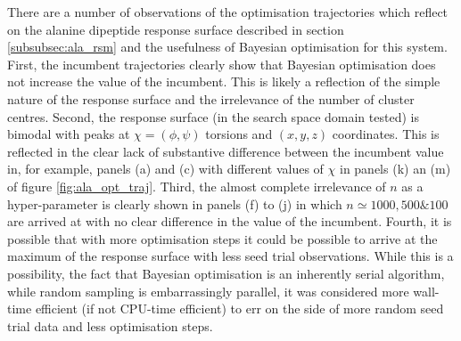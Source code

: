 There are a number of observations of the optimisation trajectories which reflect on the alanine dipeptide response surface described in section \ref{subsubsec:ala_rsm} and the usefulness of Bayesian optimisation for this system. First, the incumbent trajectories clearly show that Bayesian optimisation does not increase the value of the incumbent. This is likely a reflection of the simple nature of the response surface and the irrelevance of the number of cluster centres. Second, the response surface (in the search space domain tested) is bimodal with peaks at $\chi=(\phi, \psi)$ torsions and $(x, y, z)$ coordinates. This is reflected in the clear lack of substantive difference between the incumbent value in, for example, panels (a) and (c) with different values of $\chi$ in panels (k) an (m)  of figure \ref{fig:ala_opt_traj}. Third, the almost complete irrelevance of $n$ as a hyper-parameter is clearly shown in panels (f) to (j) in which $n \simeq 1000, 500 \& 100$ are arrived at with no clear difference in the value of the incumbent. Fourth, it is possible that with more optimisation steps it could be possible to arrive at the maximum of the response surface with less seed trial observations. While this is a possibility, the fact that Bayesian optimisation is an inherently serial algorithm, while random sampling is embarrassingly parallel, it was considered more wall-time efficient (if not CPU-time efficient) to err on the side of more random seed trial data and less optimisation steps. 


